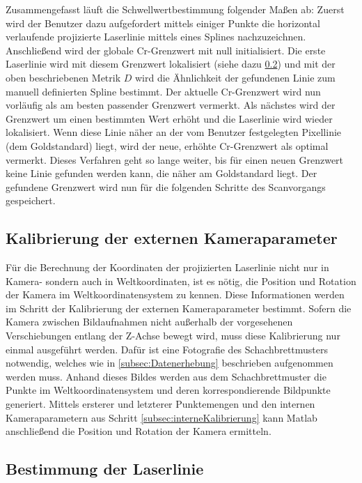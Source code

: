 \bigbreak
Zusammengefasst läuft die Schwellwertbestimmung folgender Maßen ab: Zuerst wird der Benutzer dazu aufgefordert mittels einiger Punkte die horizontal verlaufende projizierte Laserlinie mittels eines Splines nachzuzeichnen. Anschließend wird der globale Cr-Grenzwert mit null initialisiert. Die erste Laserlinie wird mit diesem Grenzwert lokalisiert (siehe dazu \ref{subsec:LaserLinieBestimmung}) und mit der oben beschriebenen Metrik \(D\) wird die Ähnlichkeit der gefundenen Linie zum manuell definierten Spline bestimmt. Der aktuelle Cr-Grenzwert wird nun vorläufig als am besten passender Grenzwert vermerkt. Als nächstes wird der Grenzwert um einen bestimmten Wert erhöht und die Laserlinie wird wieder lokalisiert. Wenn diese Linie näher an der vom Benutzer festgelegten Pixellinie (dem Goldstandard) liegt, wird der neue, erhöhte Cr-Grenzwert als optimal vermerkt. Dieses Verfahren geht so lange weiter, bis für einen neuen Grenzwert keine Linie gefunden werden kann, die näher am Goldstandard liegt. Der gefundene Grenzwert wird nun für die folgenden Schritte des Scanvorgangs gespeichert.


\subsection{Kalibrierung der externen Kameraparameter}
\label{subsec:externeKalibrierung}
Für die Berechnung der Koordinaten der projizierten Laserlinie nicht nur in Kamera- sondern auch in Weltkoordinaten, ist es nötig, die Position und Rotation der Kamera im Weltkoordinatensystem zu kennen. Diese Informationen werden im Schritt der Kalibrierung der externen Kameraparameter bestimmt. Sofern die Kamera zwischen Bildaufnahmen nicht außerhalb der vorgesehenen Verschiebungen entlang der Z-Achse bewegt wird, muss diese Kalibrierung nur einmal ausgeführt werden. Dafür ist eine Fotografie des Schachbrettmusters notwendig, welches wie in \ref{subsec:Datenerhebung} beschrieben aufgenommen werden muss. Anhand dieses Bildes werden aus dem Schachbrettmuster die Punkte im Weltkoordinatensystem und deren korrespondierende Bildpunkte generiert. Mittels ersterer und letzterer Punktemengen und den internen Kameraparametern aus Schritt \ref{subsec:interneKalibrierung} kann Matlab anschließend die Position und Rotation der Kamera ermitteln.

\subsection{Bestimmung der Laserlinie}
\label{subsec:LaserLinieBestimmung}

